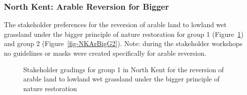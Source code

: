 \documentclass[
  12pt,
  letterpaper,
  DIV=11,
  numbers=noendperiod]{scrartcl}
\begin{document}
\newpage{}

\subsubsection{North Kent: Arable Reversion for
Bigger}\label{north-kent-arable-reversion-for-bigger}

The stakeholder preferences for the reversion of arable land to lowland
wet grassland under the bigger principle of nature restoration for group
1 (Figure~\ref{fig-NKArBigG1}) and group 2 (Figure~\ref{fig-NKArBigG2}).
Note: during the stakeholder workshops no guidelines or masks were
created specifically for arable reversion.

\begin{figure}[H]


\caption{\label{fig-NKArBigG1}Stakeholder gradings for group 1 in North
Kent for the reversion of arable land to lowland wet grassland under the
bigger principle of nature restoration}

\end{figure}%
\end{document}
